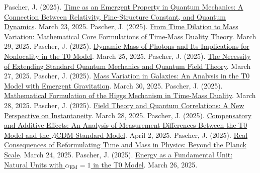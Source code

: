 \documentclass[12pt,a4paper]{article}
\newcommand{\alphaEM}{\alpha_{\text{EM}}}
\begin{document}
	\begin{thebibliography}{99}
		 Pascher, J. (2025). \href{https://github.com/jpascher/T0-Time-Mass-Duality/tree/main/2/pdf/English/ZeitEmergentQMEn.pdf}{Time as an Emergent Property in Quantum Mechanics: A Connection Between Relativity, Fine-Structure Constant, and Quantum Dynamics}. March 23, 2025.
		 Pascher, J. (2025). \href{https://github.com/jpascher/T0-Time-Mass-Duality/tree/main/2/pdf/English/MathZeitMasseLagrangeEn.pdf}{From Time Dilation to Mass Variation: Mathematical Core Formulations of Time-Mass Duality Theory}. March 29, 2025.
		 Pascher, J. (2025). \href{https://github.com/jpascher/T0-Time-Mass-Duality/tree/main/2/pdf/English/DynMassePhotonenNichtlokalEn.pdf}{Dynamic Mass of Photons and Its Implications for Nonlocality in the T0 Model}. March 25, 2025.
		 Pascher, J. (2025). \href{https://github.com/jpascher/T0-Time-Mass-Duality/tree/main/2/pdf/English/NotwendigkeitQMErweiterungEn.pdf}{The Necessity of Extending Standard Quantum Mechanics and Quantum Field Theory}. March 27, 2025.
		 Pascher, J. (2025). \href{https://github.com/jpascher/T0-Time-Mass-Duality/tree/main/2/pdf/English/MassVarGalaxienEn.pdf}{Mass Variation in Galaxies: An Analysis in the T0 Model with Emergent Gravitation}. March 30, 2025.
		 Pascher, J. (2025). \href{https://github.com/jpascher/T0-Time-Mass-Duality/tree/main/2/pdf/English/MathHiggsZeitMasseEn.pdf}{Mathematical Formulation of the Higgs Mechanism in Time-Mass Duality}. March 28, 2025.
		 Pascher, J. (2025). \href{https://github.com/jpascher/T0-Time-Mass-Duality/tree/main/2/pdf/English/FeldtheorieQuantenEn.pdf}{Field Theory and Quantum Correlations: A New Perspective on Instantaneity}. March 28, 2025.
		 Pascher, J. (2025). \href{https://github.com/jpascher/T0-Time-Mass-Duality/tree/main/2/pdf/English/MessdifferenzenT0StandardEn.pdf}{Compensatory and Additive Effects: An Analysis of Measurement Differences Between the T0 Model and the \(\Lambda\)CDM Standard Model}. April 2, 2025.
		 Pascher, J. (2025). \href{https://github.com/jpascher/T0-Time-Mass-Duality/tree/main/2/pdf/English/JenseitsPlanckEn.pdf}{Real Consequences of Reformulating Time and Mass in Physics: Beyond the Planck Scale}. March 24, 2025.
		 Pascher, J. (2025). \href{https://github.com/jpascher/T0-Time-Mass-Duality/tree/main/2/pdf/English/NatEinheitenAlpha1En.pdf}{Energy as a Fundamental Unit: Natural Units with \(\alphaEM = 1\) in the T0 Model}. March 26, 2025.

\end{thebibliography}
\end{document}
